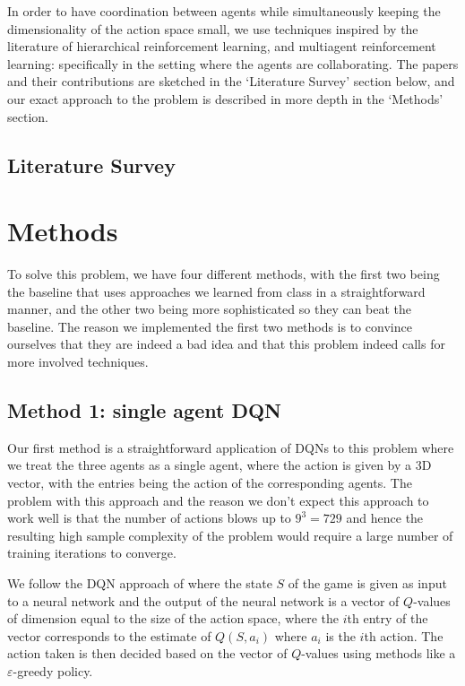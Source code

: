 \documentclass{article}
\begin{document}
In order to have coordination between agents while
simultaneously keeping the dimensionality
of the action space small, we use techniques inspired
by the literature of hierarchical reinforcement learning,
and multiagent reinforcement learning: specifically in
the setting where the agents are collaborating.
The papers and their contributions are sketched in
the `Literature Survey' section below, and our exact
approach to the problem is described in more depth
in the `Methods' section.

\subsection*{Literature Survey}

\section{Methods}

To solve this problem, we have four different methods, with the
first two being the baseline that uses approaches we learned
from class in a straightforward manner, and the other two being
more sophisticated so they can beat the baseline. The
reason we implemented the first two methods is to
convince ourselves that they are indeed a bad idea and that
this problem indeed calls for more involved techniques.


\subsection{Method 1: single agent DQN}
Our first method is a straightforward application of
DQNs to this
problem where we treat the three agents as a single agent,
where the action is given by a 3D vector, with the
entries being the action of the corresponding agents.
The problem with this approach and the reason we don't expect
this approach to work well is that the number of actions blows
up to $9^3=729$ and hence the resulting high sample complexity
of the problem would require a large number of training
iterations to converge.

We follow the DQN approach of \cite{mnih2013playing}
where the state $S$ of the game is given as input to a
neural network and the output of the neural network
is a vector of $Q$-values of dimension equal to the
size of the action space, where the $i$th entry of the
vector corresponds to the estimate of $Q(S,a_i)$ where $a_i$
is the $i$th action. The action taken is then decided
based on the vector of $Q$-values using methods like
a $\varepsilon$-greedy policy.
\end{document}
